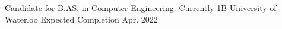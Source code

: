 

\begin{cventries}

  \cventry
    {Candidate for B.AS. in Computer Engineering. Currently 1B} %
    {University of Waterloo} %
    {} %
    {Expected Completion Apr. 2022} %
    {}

\end{cventries}
